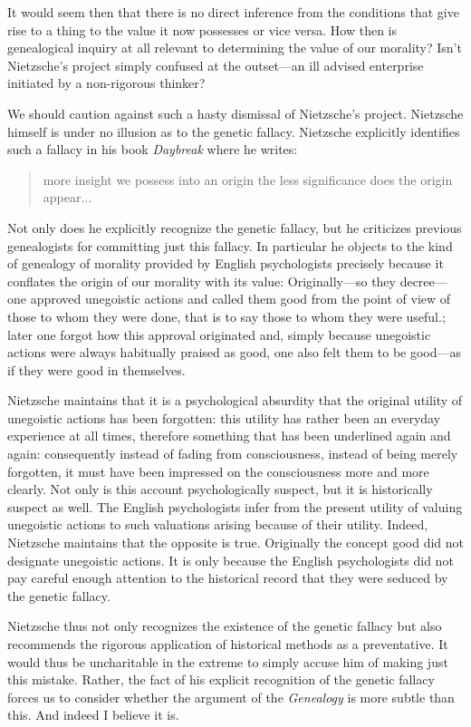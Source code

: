 It would seem then that there is no direct inference from the conditions that give rise to a thing to the value it now possesses or vice versa. How then is genealogical inquiry at all relevant to determining the value of our morality? Isn't Nietzsche's project simply confused at the outset---an ill advised enterprise initiated by a non-rigorous thinker?

We should caution against such a hasty dismissal of Nietzsche's project. Nietzsche himself is under no illusion as to the genetic fallacy. Nietzsche explicitly identifies such a fallacy in his book \emph{Daybreak} where he writes:
\begin{quote}
	more insight we possess into an origin the less significance does the origin appear... 
\end{quote}
Not only does he explicitly recognize the genetic fallacy, but he criticizes previous genealogists for committing just this fallacy. In particular he objects to the kind of genealogy of morality provided by English psychologists precisely because it conflates the origin of our morality with its value:
Originally---so they decree---one approved unegoistic actions and called them good from the point of view of those to whom they were done, that is to say those to whom they were useful.; later one forgot how this approval originated and, simply because unegoistic actions were always habitually praised as good, one also felt them to be good---as if they were good in themselves.

Nietzsche maintains that it is a psychological absurdity that the original utility of unegoistic actions has been forgotten: this utility has rather been an everyday experience at all times, therefore something that has been underlined again and again: consequently instead of fading from consciousness, instead of being merely forgotten, it must have been impressed on the consciousness more and more clearly. Not only is this account psychologically suspect, but it is historically suspect as well. The English psychologists infer from the present utility of valuing unegoistic actions to such valuations arising because of their utility. Indeed, Nietzsche maintains that the opposite is true. Originally the concept good did not designate unegoistic actions. It is only because the English psychologists did not pay careful enough attention to the historical record that they were seduced by the genetic fallacy.

Nietzsche thus not only recognizes the existence of the genetic fallacy but also recommends the rigorous application of historical methods as a preventative. It would thus be uncharitable in the extreme to simply accuse him of making just this mistake. Rather, the fact of his explicit recognition of the genetic fallacy forces us to consider whether the argument of the \emph{Genealogy} is more subtle than this. And indeed I believe it is.

